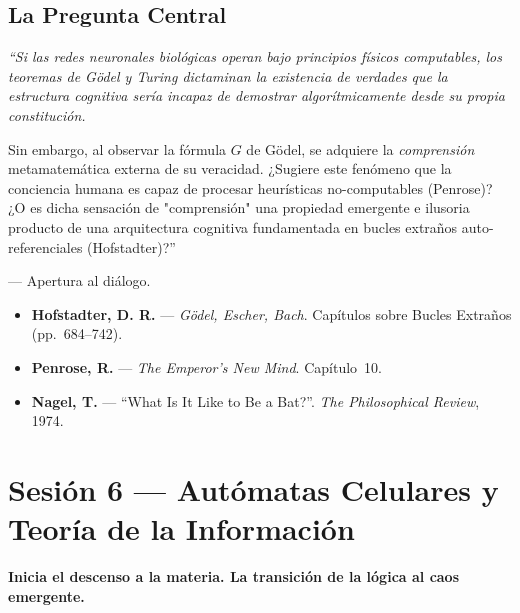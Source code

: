 \documentclass[11pt, letterpaper]{article}
\begin{document}
\subsection*{La Pregunta Central}
\begin{tcolorbox}[colback=outdoorgreen!5, colframe=outdoorgreen, boxrule=0.7pt, left=8pt, right=8pt, top=6pt, bottom=6pt]
{\itshape ``Si las redes neuronales biol\'ogicas operan bajo principios f\'isicos computables, los teoremas de G\"odel y Turing dictaminan la existencia de verdades que la estructura cognitiva ser\'ia incapaz de demostrar algor\'itmicamente desde su propia constituci\'on.

Sin embargo, al observar la f\'ormula $G$ de G\"odel, se adquiere la \emph{comprensi\'on} metamatem\'atica externa de su veracidad. ¿Sugiere este fen\'omeno que la conciencia humana es capaz de procesar heur\'isticas no-computables (Penrose)? ¿O es dicha sensaci\'on de "comprensi\'on" una propiedad emergente e ilusoria producto de una arquitectura cognitiva fundamentada en bucles extra\~nos auto-referenciales (Hofstadter)?''}

\medskip
\hfill --- Apertura al di\'alogo.
\end{tcolorbox}

\begin{lecturas}
\begin{itemize}
  \item[$(\star)$] \textbf{Hofstadter, D. R.} --- \emph{G\"odel, Escher, Bach}. Cap\'itulos sobre Bucles Extra\~nos (pp.\ 684--742).
  \item \textbf{Penrose, R.} --- \emph{The Emperor's New Mind}. Cap\'itulo~10.
  \item \textbf{Nagel, T.} --- ``What Is It Like to Be a Bat?''. \textit{The Philosophical Review}, 1974.
\end{itemize}
\end{lecturas}

\newpage

\section{Sesi\'on 6 --- Aut\'omatas Celulares y Teor\'ia de la Informaci\'on}

\textcolor{mitred}{\textbf{Inicia el descenso a la materia. La transici\'on de la l\'ogica al caos emergente.}}
\end{document}
